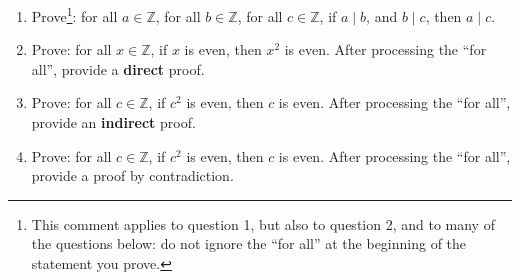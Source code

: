 \documentclass{article}
\begin{document}
\begin{enumerate}
            \newpage

      \item Prove\footnote{This comment applies to question 1, but also to question 2, and
                  to many of the questions below: do not ignore the ``for all'' at the beginning
                  of the statement you prove.}: for all $a \in \mathbb{Z}$, for all $b \in
                  \mathbb{Z}$, for all $c \in \mathbb{Z}$, if $a \mid b$, and $b \mid c$, then $a
                  \mid c$.

            \newpage

      \item Prove: for all $x \in \mathbb{Z}$, if $x$ is even, then $x^2$ is even. After
            processing the ``for all'', provide a {\bf direct} proof.

            \newpage

      \item Prove: for all $c \in \mathbb{Z}$, if $c^2$ is even, then $c$ is even. After
            processing the ``for all'', provide an {\bf indirect} proof.

            \newpage

      \item Prove: for all $c \in \mathbb{Z}$, if $c^2$ is even, then $c$ is even. After
            processing the ``for all'', provide a proof by contradiction.

\end{enumerate}
\end{document}
